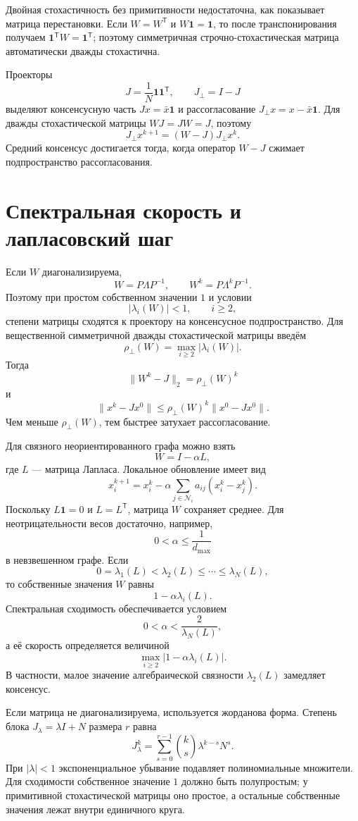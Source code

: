 Двойная стохастичность без примитивности недостаточна, как показывает
матрица перестановки. Если \(W=W^{\mathsf T}\) и
\(W\mathbf1=\mathbf1\), то после транспонирования получаем
\(\mathbf1^{\mathsf T}W=\mathbf1^{\mathsf T}\); поэтому симметричная
строчно-стохастическая матрица автоматически дважды стохастична.

Проекторы
\[
    J=\frac1N\mathbf1\mathbf1^{\mathsf T},
    \qquad
    J_\perp=I-J
\]
выделяют консенсусную часть \(Jx=\bar x\mathbf1\) и рассогласование
\(J_\perp x=x-\bar x\mathbf1\). Для дважды стохастической матрицы
\(WJ=JW=J\), поэтому
\[
    J_\perp x^{k+1}
    =
    (W-J)J_\perp x^k.
\]
Средний консенсус достигается тогда, когда оператор \(W-J\) сжимает
подпространство рассогласования.

\section{Спектральная скорость и лапласовский шаг}

Если \(W\) диагонализируема,
\[
    W=P\Lambda P^{-1},
    \qquad
    W^k=P\Lambda^kP^{-1}.
\]
Поэтому при простом собственном значении \(1\) и условии
\[
    |\lambda_i(W)|<1,
    \qquad i\ge2,
\]
степени матрицы сходятся к проектору на консенсусное подпространство.
Для вещественной симметричной дважды стохастической матрицы введём
\[
    \rho_\perp(W)
    =
    \max_{i\ge2}|\lambda_i(W)|.
\]
Тогда
\[
    \lVert W^k-J\rVert_2
    =
    \rho_\perp(W)^k
\]
и
\[
    \lVert x^k-Jx^0\rVert
    \le
    \rho_\perp(W)^k
    \lVert x^0-Jx^0\rVert.
\]
Чем меньше \(\rho_\perp(W)\), тем быстрее затухает рассогласование.

Для связного неориентированного графа можно взять
\[
    W=I-\alpha L,
\]
где \(L\) --- матрица Лапласа. Локальное обновление имеет вид
\[
    x_i^{k+1}
    =
    x_i^k
    -
    \alpha
    \sum_{j\in\mathcal N_i}
    a_{ij}(x_i^k-x_j^k).
\]
Поскольку \(L\mathbf1=0\) и \(L=L^{\mathsf T}\), матрица \(W\)
сохраняет среднее. Для неотрицательности весов достаточно, например,
\[
    0<\alpha\le\frac1{d_{\max}}
\]
в невзвешенном графе. Если
\[
    0=\lambda_1(L)<\lambda_2(L)\le\cdots\le\lambda_N(L),
\]
то собственные значения \(W\) равны
\[
    1-\alpha\lambda_i(L).
\]
Спектральная сходимость обеспечивается условием
\[
    0<\alpha<\frac{2}{\lambda_N(L)},
\]
а её скорость определяется величиной
\[
    \max_{i\ge2}|1-\alpha\lambda_i(L)|.
\]
В частности, малое значение алгебраической связности
\(\lambda_2(L)\) замедляет консенсус.

Если матрица не диагонализируема, используется жорданова форма.
Степень блока \(J_\lambda=\lambda I+N\) размера \(r\) равна
\[
    J_\lambda^k
    =
    \sum_{s=0}^{r-1}
    \binom{k}{s}\lambda^{k-s}N^s.
\]
При \(|\lambda|<1\) экспоненциальное убывание подавляет
полиномиальные множители. Для сходимости собственное значение \(1\)
должно быть полупростым; у примитивной стохастической матрицы оно
простое, а остальные собственные значения лежат внутри единичного
круга.

